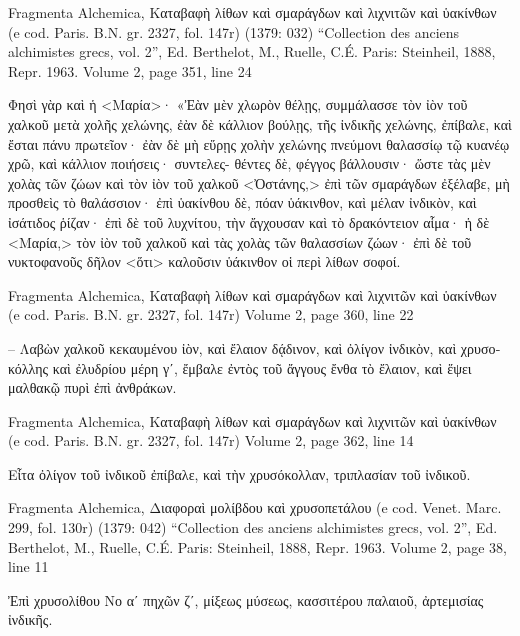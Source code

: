 \documentclass[12pt,letterpaper,twoside,final]{memoir}
\begin{document}
\begin{greek}
Fragmenta Alchemica, Καταβαφὴ λίθων καὶ σμαράγδων καὶ λιχνιτῶν καὶ ὑακίνθων (e cod. Paris. B.N. gr. 2327, fol. 147r) (1379: 032)
“Collection des anciens alchimistes grecs, vol. 2”, Ed. Berthelot, M., Ruelle, C.É.
Paris: Steinheil, 1888, Repr. 1963.
Volume 2, page 351, line 24

                                                          Φησὶ γὰρ καὶ ἡ 
<Μαρία>· «Ἐὰν μὲν χλωρὸν θέλῃς, συμμάλασσε τὸν ἰὸν τοῦ χαλκοῦ 
μετὰ χολῆς χελώνης, ἐὰν δὲ κάλλιον βούλῃς, τῆς ἰνδικῆς χελώνης, 
ἐπίβαλε, καὶ ἔσται πάνυ πρωτεῖον· ἐὰν δὲ μὴ εὕρῃς χολὴν χελώνης 
πνεύμονι θαλασσίῳ τῷ κυανέῳ χρῶ, καὶ κάλλιον ποιήσεις· συντελες-
θέντες δὲ, φέγγος βάλλουσιν· ὥστε τὰς μὲν χολὰς τῶν 
ζώων καὶ τὸν ἰὸν τοῦ χαλκοῦ <Ὀστάνης,> ἐπὶ τῶν σμαράγδων ἐξέλαβε, 
μὴ προσθεὶς τὸ θαλάσσιον· ἐπὶ ὑακίνθου δὲ, πόαν ὑάκινθον, καὶ μέλαν   
ἰνδικὸν, καὶ ἰσάτιδος ῥίζαν· ἐπὶ δὲ τοῦ λυχνίτου, τὴν ἄγχουσαν καὶ τὸ 
δρακόντειον αἷμα· ἡ δὲ <Μαρία,> τὸν ἰὸν τοῦ χαλκοῦ καὶ τὰς χολὰς 
τῶν θαλασσίων ζώων· ἐπὶ δὲ τοῦ νυκτοφανοῦς δῆλον <ὅτι> καλοῦσιν 
ὑάκινθον οἱ περὶ λίθων σοφοί. 



Fragmenta Alchemica, Καταβαφὴ λίθων καὶ σμαράγδων καὶ λιχνιτῶν καὶ ὑακίνθων (e cod. Paris. B.N. gr. 2327, fol. 147r) 
Volume 2, page 360, line 22

                                     – Λαβὼν χαλκοῦ κεκαυμένου ἰὸν, καὶ 
ἔλαιον δᾴδινον, καὶ ὀλίγον ἰνδικὸν, καὶ χρυσοκόλλης καὶ ἐλυδρίου μέρη 
γʹ, ἔμβαλε ἐντὸς τοῦ ἄγγους ἔνθα τὸ ἔλαιον, καὶ ἕψει μαλθακῷ πυρὶ 
ἐπὶ ἀνθράκων. 



Fragmenta Alchemica, Καταβαφὴ λίθων καὶ σμαράγδων καὶ λιχνιτῶν καὶ ὑακίνθων (e cod. Paris. B.N. gr. 2327, fol. 147r) 
Volume 2, page 362, line 14

               Εἶτα ὀλίγον τοῦ ἰνδικοῦ ἐπίβαλε, καὶ τὴν χρυσόκολλαν, 
τριπλασίαν τοῦ ἰνδικοῦ. 




Fragmenta Alchemica, Διαφοραὶ μολίβδου καὶ χρυσοπετάλου (e cod. Venet. Marc. 299, fol. 130r) (1379: 042)
“Collection des anciens alchimistes grecs, vol. 2”, Ed. Berthelot, M., Ruelle, C.É.
Paris: Steinheil, 1888, Repr. 1963.
Volume 2, page 38, line 11

    Ἐπὶ χρυσολίθου Νο αʹ πηχῶν ζʹ, μίξεως μύσεως, κασσιτέρου 
παλαιοῦ, ἀρτεμισίας ἰνδικῆς. 


\end{greek}
\end{document}
